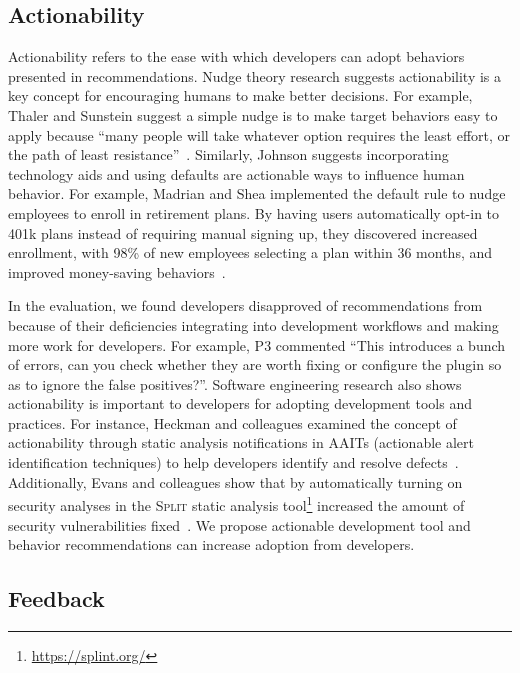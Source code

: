 

\subsection{Actionability} 

Actionability refers to the ease with which developers can adopt behaviors presented in recommendations. Nudge theory research suggests actionability is a key concept for encouraging humans to make better decisions. For example, Thaler and Sunstein suggest a simple nudge is to make target behaviors easy to apply because ``many people will take whatever option requires the least effort, or the path of least resistance''~\citep[p.~85]{nudge}. Similarly, Johnson suggests incorporating technology aids and using defaults are actionable ways to influence human behavior. For example, Madrian and Shea implemented the default rule to nudge employees to enroll in retirement plans. By having users automatically opt-in to 401k plans instead of requiring manual signing up, they discovered increased enrollment, with 98\% of new employees selecting a plan within 36 months, and improved money-saving behaviors~\cite{madrian2001power}. 

In the \tele evaluation, we found developers disapproved of recommendations from \toolone because of their deficiencies integrating into development workflows and making more work for developers. For example, P3 commented ``This introduces a bunch of errors, can you check whether they are worth fixing or configure the plugin so as to ignore the false positives?''. Software engineering research also shows actionability is important to developers for adopting development tools and practices. For instance, Heckman and colleagues examined the concept of actionability through static analysis notifications in AAITs (actionable alert identification techniques) to help developers identify and resolve defects~\cite{Heckman11Actionable}. Additionally, Evans and colleagues show that by automatically turning on security analyses in the \textsc{Split} static analysis tool\footnote{\url{https://splint.org/}} increased the amount of security vulnerabilities fixed~\cite{evans2002splint}. We propose actionable development tool and behavior recommendations can increase adoption from developers.

\subsection{Feedback} 

